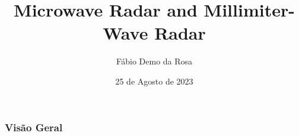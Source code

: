 \documentclass[xcolor=dvipsnames, aspectratio=169]{beamer}
\title[]{Microwave Radar and Millimiter-Wave Radar} %
\author[]{Fábio Demo da Rosa} %
\institute[UFSM] %
{
Universidade Federal de Santa Maria \\ %
Pós-Graduação em Ciência da Computação \\
Disciplina de Robótica Móvel\\
\medskip
\textit{faberdemo@gmail.com} %
}
\date{25 de Agosto de 2023} %
\begin{document}
\begin{frame}
\titlepage %
\end{frame}

\begin{frame}
\frametitle{Visão Geral} %
\tableofcontents %
\end{frame}


\end{document}
